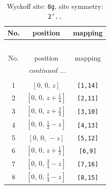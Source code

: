 \documentclass[fleqn,8pt]{jsarticle}
\begin{document}
\renewcommand{\arraystretch}{1.2}
\begin{longtable}{ccc}
\caption{Wyckoff site: {\tt 8g}, site symmetry: {\tt 2'..}}
 \\
 \hline \hline
No. & position & mapping \\ \hline \endfirsthead

\multicolumn{2}{l}{\tablename\ \thetable{}} \\
 \hline \hline
No. & position & mapping \\ \hline \endhead

 \hline \hline
\multicolumn{2}{r}{\footnotesize\it continued ...} \\ \endfoot

 \hline \hline
\multicolumn{2}{r}{} \\ \endlastfoot

1 & $\left[ 0,\, 0,\, z \right]$ & {\tt [1,14]} \\ \hline
2 & $\left[ 0,\, 0,\, z + \frac{1}{4} \right]$ & {\tt [2,11]} \\ \hline
3 & $\left[ 0,\, 0,\, z + \frac{3}{4} \right]$ & {\tt [3,10]} \\ \hline
4 & $\left[ 0,\, 0,\, \frac{1}{2} - z \right]$ & {\tt [4,13]} \\ \hline
5 & $\left[ 0,\, 0,\, - z \right]$ & {\tt [5,12]} \\ \hline
6 & $\left[ 0,\, 0,\, z + \frac{1}{2} \right]$ & {\tt [6,9]} \\ \hline
7 & $\left[ 0,\, 0,\, \frac{3}{4} - z \right]$ & {\tt [7,16]} \\ \hline
8 & $\left[ 0,\, 0,\, \frac{1}{4} - z \right]$ & {\tt [8,15]} \\
\end{longtable}
\renewcommand{\arraystretch}{1.2}
\end{document}
